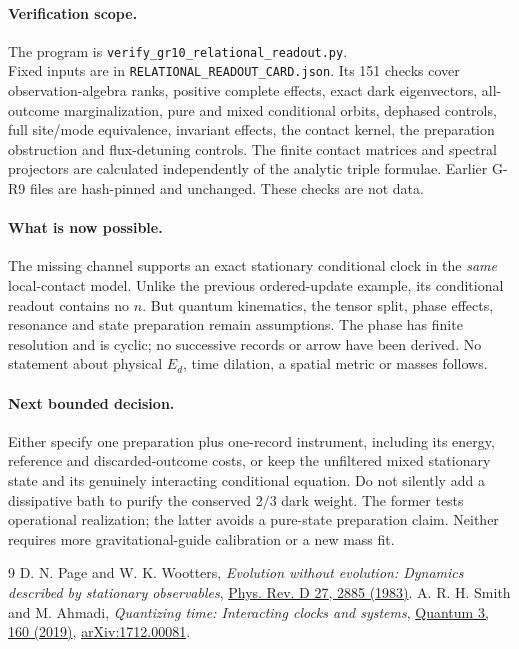 \documentclass[11pt,a4paper]{article}
\begin{document}
\paragraph{Verification scope.}
The program is \texttt{verify\_gr10\_relational\_readout.py}.\\
Fixed inputs are in \texttt{RELATIONAL\_READOUT\_CARD.json}.
Its 151 checks cover
observation-algebra ranks, positive complete effects, exact dark
eigenvectors, all-outcome marginalization, pure and mixed conditional
orbits, dephased controls, full site/mode equivalence, invariant effects,
the contact kernel, the preparation obstruction and flux-detuning
controls. The finite contact matrices and spectral projectors are
calculated independently of the analytic triple formulae. Earlier
G-R9 files are hash-pinned and unchanged. These checks are not data.

\paragraph{What is now possible.}
The missing channel supports an exact stationary conditional clock in
the \emph{same} local-contact model. Unlike the previous ordered-update
example, its conditional readout contains no $n$. But quantum kinematics,
the tensor split, phase effects, resonance and state preparation remain
assumptions. The phase has finite resolution and is cyclic; no
successive records or arrow have been derived. No statement about
physical $E_d$, time dilation, a spatial metric or masses follows.

\paragraph{Next bounded decision.}
Either specify one preparation plus one-record instrument, including
its energy, reference and discarded-outcome costs, or keep the
unfiltered mixed stationary state and its genuinely interacting
conditional equation. Do not silently add a dissipative bath to purify
the conserved $2/3$ dark weight. The former tests operational realization;
the latter avoids a pure-state preparation claim. Neither requires
more gravitational-guide calibration or a new mass fit.

\begin{thebibliography}{9}
 D. N. Page and W. K. Wootters,
\emph{Evolution without evolution: Dynamics described by stationary observables},
\href{https://doi.org/10.1103/PhysRevD.27.2885}{Phys. Rev. D 27, 2885 (1983)}.
 A. R. H. Smith and M. Ahmadi,
\emph{Quantizing time: Interacting clocks and systems},
\href{https://doi.org/10.22331/q-2019-07-08-160}{Quantum 3, 160 (2019)},
\href{https://arxiv.org/abs/1712.00081}{arXiv:1712.00081}.
\end{thebibliography}
\end{document}
